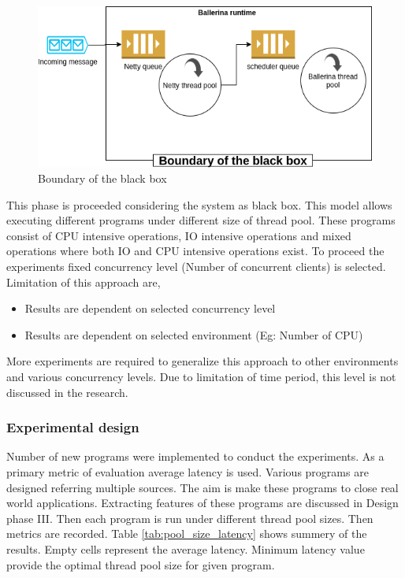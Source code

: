  
\begin{figure}[htbp]
	\begin{center}
		\includegraphics[scale=0.5]{figures/black_box_boundary.png}
	\end{center}
	\caption{Boundary of the black box}
	\label{black_box_boundary}
\end{figure}


This phase is proceeded considering the system as black box. This model allows executing different programs under different size of thread pool. These programs consist of CPU intensive operations, IO intensive operations and mixed operations where both IO and CPU intensive operations exist. To proceed the experiments fixed concurrency level (Number of concurrent clients) is selected. 
Limitation of this approach are,

\begin{itemize}
	\item Results are dependent on selected concurrency level
	\item Results are dependent on selected environment (Eg: Number of CPU)
	
\end{itemize} 
More experiments are required to generalize this approach to other environments and various concurrency levels. Due to limitation of time period, this level is not discussed in the research. 
	
\subsubsection{Experimental design} 

Number of new programs were implemented to conduct the experiments. As a primary metric of evaluation average latency is used. Various programs are designed referring multiple sources. The aim is make these programs to close real world applications. Extracting features of these programs are discussed in Design phase III. Then each program is run under different thread pool sizes. Then metrics are recorded. Table \ref{tab:pool_size_latency} shows summery of the results. Empty cells represent the average latency. Minimum latency value provide the optimal thread pool size for given program. 

